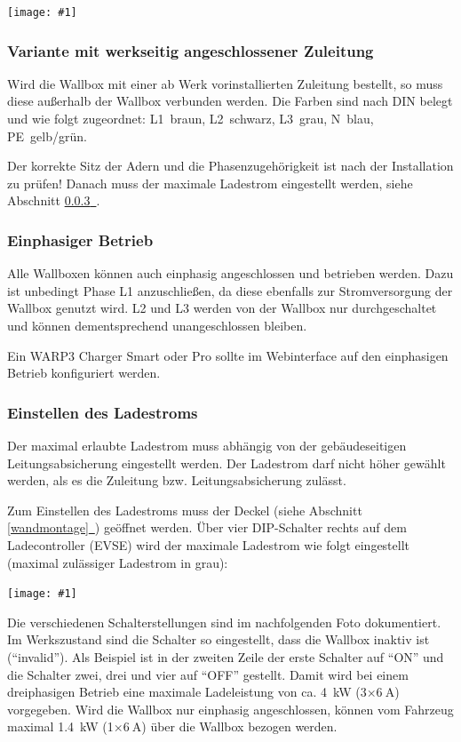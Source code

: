 \documentclass[a4paper,10pt]{article}
\newcommand{\hint}[1]{\begin{tcolorbox}[colback=boxgray,colframe=black,coltext=
white,title=Hinweis,left*=2mm,right*=2mm,boxsep=1mm,bottom=1mm,top=1mm]#1\end{tcolorbox}}
\newcommand{\gfx}[1]{\texttt{[image: \#1]}}
\newcommand*{\fullref}[1]{Abschnitt \hyperref[{#1}]{\ref*{#1}~\nameref*{#1}}}
\begin{document}
\begin{multicols*}{2}
    \gfx{./img_warp3/resized/warp3_back.jpg}

    \vspace{-0.01cm}

    \subsubsection{Variante mit werkseitig angeschlossener Zuleitung}
    Wird die Wallbox mit einer ab Werk vorinstallierten Zuleitung bestellt, so
    muss diese außerhalb der Wallbox verbunden werden. Die Farben sind nach DIN belegt und wie
    folgt zugeordnet: L1~braun, L2~schwarz, L3~grau, N~blau, PE~gelb/grün.

    Der korrekte Sitz der Adern und die Phasenzugehörigkeit ist nach der
    Installation zu prüfen!
    Danach muss der maximale Ladestrom eingestellt werden, siehe
	\fullref{ladestrom_schalter}.

    \subsubsection{Einphasiger Betrieb}
    Alle Wallboxen können auch einphasig angeschlossen und betrieben werden.
    Dazu ist unbedingt Phase L1 anzuschließen, da diese ebenfalls zur
    Stromversorgung der Wallbox genutzt wird. L2 und L3 werden von der Wallbox
    nur durchgeschaltet und können dementsprechend unangeschlossen bleiben.
    \hint{Ein WARP3 Charger Smart oder Pro sollte im Webinterface auf den
    einphasigen Betrieb konfiguriert werden.}

    \subsubsection{Einstellen des Ladestroms}\label{ladestrom_schalter}
    Der maximal erlaubte Ladestrom muss abhängig von der gebäudeseitigen
    Leitungsabsicherung eingestellt werden. Der Ladestrom darf nicht höher gewählt
    werden, als es die Zuleitung bzw. Leitungsabsicherung zulässt.

    Zum Einstellen des Ladestroms muss der Deckel (siehe \fullref{wandmontage})
    geöffnet werden. Über vier DIP-Schalter rechts auf dem Ladecontroller (EVSE) wird der
    maximale Ladestrom wie folgt eingestellt (maximal zulässiger Ladestrom in grau):

    \gfx{./img_warp3/resized/warp3_switch_location.jpg}

    Die verschiedenen Schalterstellungen sind im nachfolgenden Foto dokumentiert.
    Im Werkszustand sind die Schalter so eingestellt, dass die Wallbox inaktiv
	ist (\enquote{invalid}).
	Als Beispiel ist in der zweiten Zeile der erste Schalter auf \enquote{ON} und die Schalter zwei, drei und vier auf \enquote{OFF} gestellt.
    Damit wird bei einem dreiphasigen
    Betrieb eine maximale Ladeleistung von ca. \SI{4}{\kilo\watt} (3$\times\SI{6}{\ampere}$) vorgegeben.
    Wird die Wallbox nur einphasig angeschlossen, können vom Fahrzeug maximal
    \SI{1,4}{\kilo\watt} (1$\times\SI{6}{\ampere}$) über die Wallbox bezogen werden.


\end{multicols*}
\end{document}
